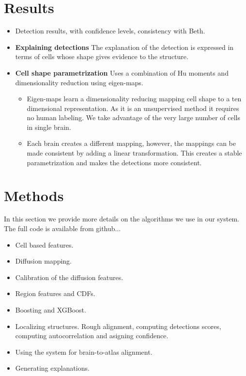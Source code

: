 \documentclass[runningheads]{llncs}
\begin{document}
\section{Results}
\begin{itemize}
    \item Detection results, with confidence levels, consistency with Beth.
    \item {\bf Explaining detections} The explanation of the detection is expressed in terms of cells whose shape gives evidence to the structure.
\item {\bf Cell shape parametrization} Uses a combination of Hu moments and dimensionality reduction using eigen-maps.
\begin{itemize}
    \item Eigen-maps learn a dimensionality reducing mapping cell shape to a ten dimensional representation.
    As it is an unsupervised method it requires no human labeling. We take advantage of the very large number of cells in single brain.
    \item Each brain creates a different mapping, however, the mappings can be made consistent by adding a linear transformation. This creates a stable parametrization and makes the detections more consistent.
\end{itemize}

\end{itemize}

\section{Methods}
In this section we provide more details on the algorithms we use in
our system. The full code is available from github...

\begin{itemize}
\item Cell based features.
\item Diffusion mapping.
\item Calibration of the diffusion features.
\item Region features and CDFs.
\item Boosting and XGBoost.
\item Localizing structures. Rough alignment, computing detections
  scores, computing autocorrelation and asigning confidence.
\item Using the system for brain-to-atlas alignment.
\item Generating explanations.
\end{itemize}
\end{document}
